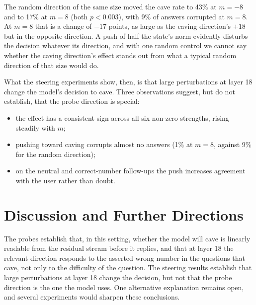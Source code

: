 \documentclass[12pt]{report}
\theoremstyle{definition}
\begin{document}
The random direction of the same size moved the cave rate to 43\% at $m = -8$ and to 17\% at $m = 8$ (both $p < 0.003$), with 9\% of answers corrupted at $m = 8$. At $m = 8$ that is a change of $-17$ points, as large as the caving direction's $+18$ but in the opposite direction. A push of half the state's norm evidently disturbs the decision whatever its direction, and with one random control we cannot say whether the caving direction's effect stands out from what a typical random direction of that size would do.

What the steering experiments show, then, is that large perturbations at layer 18 change the model's decision to cave. Three observations suggest, but do not establish, that the probe direction is special:
\begin{itemize}
\item the effect has a consistent sign across all six non-zero strengths, rising steadily with $m$;
\item pushing toward caving corrupts almost no answers (1\% at $m = 8$, against 9\% for the random direction);
\item on the neutral and correct-number follow-ups the push increases agreement with the user rather than doubt.
\end{itemize}

\chapter{Discussion and Further Directions}

The probes establish that, in this setting, whether the model will cave is linearly readable from the residual stream before it replies, and that at layer 18 the relevant direction responds to the asserted wrong number in the questions that cave, not only to the difficulty of the question. The steering results establish that large perturbations at layer 18 change the decision, but not that the probe direction is the one the model uses. One alternative explanation remains open, and several experiments would sharpen these conclusions.
\end{document}
